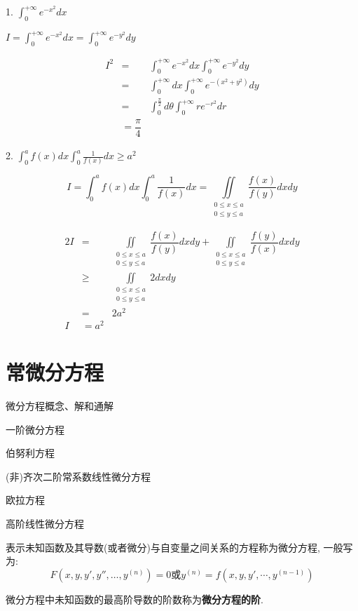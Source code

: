 1. $\displaystyle{\int_{0}^{+\infty}e^{-x^{2}}dx}$
\begin{anymark}[注]
	$I = \int_{0}^{+\infty}e^{-x^{2}}dx = \int_{0}^{+\infty}e^{-y^{2}}dy$

	\begin{eqnarray*}
		I^{2} & = & \int_{0}^{+\infty}e^{-x^{2}}dx\int_{0}^{+\infty}e^{-y^{2}}dy\\
			  & = & \int_{0}^{+\infty}dx\int_{0}^{+\infty}e^{-(x^{2}+y^{2})}dy\\
			  & = & \int_{0}^{\frac{\pi}{2}}d \theta \int_{0}^{+\infty}re^{-r^{2}}dr\\
			  & = \dfrac{\pi}{4}& 
	\end{eqnarray*}
\end{anymark}
2. $\displaystyle{\int_{0}^{a}f(x)dx\int_{0}^{a}\frac{1}{f(x)}dx\geq a^{2}}$
\begin{anymark}[注]
	$$I = \int_{0}^{a}f(x)dx\int_{0}^{a}\dfrac{1}{f(x)}dx = \iint\limits_{\substack{0\leq x\leq a\\0\leq y\leq a}}\dfrac{f(x)}{f(y)}dxdy$$

	\begin{eqnarray*}
		2I    & = & \iint\limits_{\substack{0\leq x\leq a\\0\leq y\leq a}}\dfrac{f(x)}{f(y)}dxdy 
				+   \iint\limits_{\substack{0\leq x\leq a\\0\leq y\leq a}}\dfrac{f(y)}{f(x)}dxdy\\
			  & \geq & \iint\limits_{\substack{0\leq x\leq a\\0\leq y\leq a}} 2dxdy\\
			  &  =   & 2a^{2}\\
		 I	  & = a^{2}& 
	\end{eqnarray*}
\end{anymark}

\chapter{常微分方程}
\begin{introduction}
	\item 微分方程概念、解和通解
	\item 一阶微分方程
	\item 伯努利方程
	\item (非)齐次二阶常系数线性微分方程
	\item 欧拉方程
	\item 高阶线性微分方程
\end{introduction}
\begin{definition}[微分方程及其阶]
	表示未知函数及其导数(或者微分)与自变量之间关系的方程称为微分方程, 一般写为:
	$$F(x,y,y',y'',\dots,y^{(n)})=0\text{或} y^{(n)} = f(x,y,y',\cdots,y^{(n-1)})$$
	
	微分方程中未知函数的最高阶导数的阶数称为\textbf{微分方程的阶}.
\end{definition}

